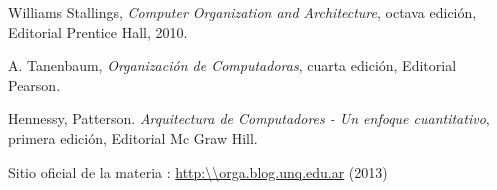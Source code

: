 \documentclass[11pt,a4paper]{book}
\begin{document}
\makeCaratulaTIP


\tableofcontents

\newpage




\appendix




\newpage
\begin{thebibliography}{9}

 Williams Stallings, \emph{Computer Organization and Architecture}, octava edición, Editorial Prentice Hall, 2010.

 A. Tanenbaum, \emph{Organización de Computadoras}, cuarta edición, Editorial Pearson.

 Hennessy, Patterson. \emph{Arquitectura de Computadores - Un enfoque cuantitativo}, primera edición,  Editorial Mc Graw Hill.

 Sitio oficial de la materia \orga: \url{http:\\orga.blog.unq.edu.ar} (2013)

\end{thebibliography}
\end{document}
